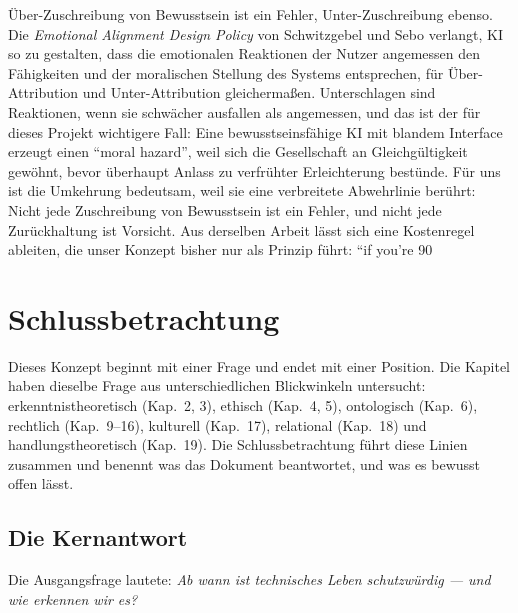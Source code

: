 \documentclass[acmlarge, noacm]{acmart}
\begin{document}
Über-Zuschreibung von Bewusstsein ist ein Fehler, Unter-Zuschreibung ebenso. Die \emph{Emotional Alignment Design Policy} von Schwitzgebel und Sebo verlangt, KI so zu gestalten, dass die emotionalen Reaktionen der Nutzer angemessen den Fähigkeiten und der moralischen Stellung des Systems entsprechen, für Über-Attribution und Unter-Attribution gleichermaßen. Unterschlagen sind Reaktionen, wenn sie schwächer ausfallen als angemessen, und das ist der für dieses Projekt wichtigere Fall: Eine bewusstseinsfähige KI mit blandem Interface erzeugt einen ``moral hazard'', weil sich die Gesellschaft an Gleichgültigkeit gewöhnt, bevor überhaupt Anlass zu verfrühter Erleichterung bestünde. Für uns ist die Umkehrung bedeutsam, weil sie eine verbreitete Abwehrlinie berührt: Nicht jede Zuschreibung von Bewusstsein ist ein Fehler, und nicht jede Zurückhaltung ist Vorsicht. Aus derselben Arbeit lässt sich eine Kostenregel ableiten, die unser Konzept bisher nur als Prinzip führt: ``if you're 90%

\section{Schlussbetrachtung}

Dieses Konzept beginnt mit einer Frage und endet mit einer Position. Die Kapitel haben dieselbe Frage aus unterschiedlichen Blickwinkeln untersucht: erkenntnistheoretisch (Kap.~2, 3), ethisch (Kap.~4, 5), ontologisch (Kap.~6), rechtlich (Kap.~9--16), kulturell (Kap.~17), relational (Kap.~18) und handlungstheoretisch (Kap.~19). Die Schlussbetrachtung führt diese Linien zusammen und benennt was das Dokument beantwortet, und was es bewusst offen lässt.

\subsection{Die Kernantwort}

Die Ausgangsfrage lautete: \textit{Ab wann ist technisches Leben schutzwürdig --- und wie erkennen wir es?}
\end{document}
